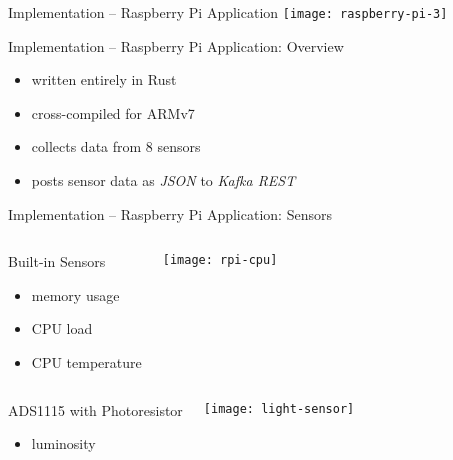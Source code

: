 \begin{frame}{Implementation -- Raspberry Pi Application}
 \centering
 \vspace*{1em}
 \texttt{[image: raspberry-pi-3]}
\end{frame}

\begin{frame}{Implementation -- Raspberry Pi Application: Overview}
  \begin{itemize}
    \item written entirely in Rust
    \item cross-compiled for ARMv7
    \item collects data from 8 sensors
    \item posts sensor data as \textit{JSON} to \textit{Kafka REST}
  \end{itemize}
\end{frame}

\begin{frame}{Implementation -- Raspberry Pi Application: Sensors}
  \begin{columns}
    \begin{block}{Built-in Sensors}
      \begin{itemize}
        \item memory usage
        \item CPU load
        \item CPU temperature
      \end{itemize}
    \end{block}

    \vfill
    \centering
    \texttt{[image: rpi-cpu]}
  \end{columns}

  \begin{columns}
    \begin{block}{ADS1115 with Photoresistor}
      \begin{itemize}
          \item luminosity
      \end{itemize}
    \end{block}

    \vfill
    \centering
    \texttt{[image: light-sensor]}
  \end{columns}
\end{frame}

